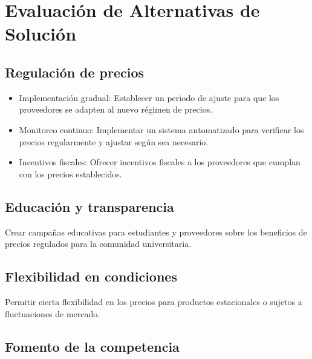 \documentclass[letterpaper, 11pt]{report}
\begin{document}
\section{Evaluación de Alternativas de Solución}

\subsection{Regulación de precios}

\begin{itemize}
      \item Implementación gradual: Establecer un periodo de ajuste para que los
            proveedores se adapten al nuevo régimen de precios.

      \item Monitoreo continuo: Implementar un sistema automatizado para verificar los
            precios regularmente y ajustar según sea necesario.

      \item Incentivos fiscales: Ofrecer incentivos fiscales a los proveedores que cumplan
            con los precios establecidos.
\end{itemize}

\subsection{Educación y transparencia}

Crear campañas educativas para estudiantes y proveedores sobre los beneficios
de precios regulados para la comunidad universitaria.

\subsection{Flexibilidad en condiciones}

Permitir cierta flexibilidad en los precios para productos estacionales o
sujetos a fluctuaciones de mercado.

\subsection{Fomento de la competencia}
\end{document}
